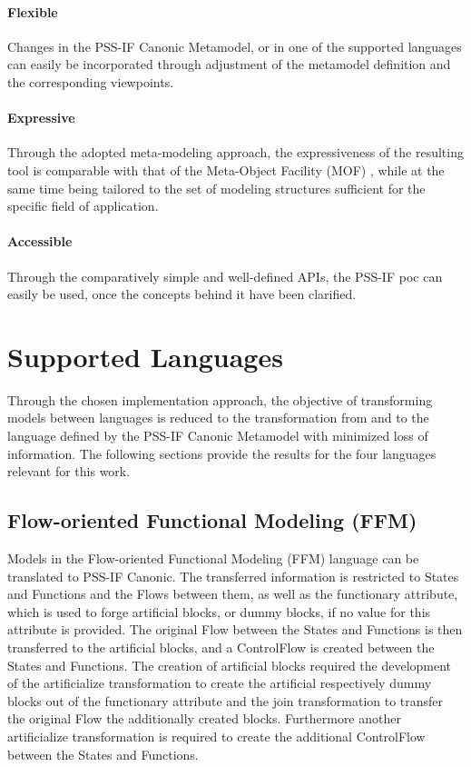 \paragraph{Flexible} Changes in the PSS-IF Canonic Metamodel, or in one of the supported languages can easily be incorporated through adjustment of the metamodel definition and the corresponding viewpoints.

\paragraph{Expressive} Through the adopted meta-modeling approach, the expressiveness of the resulting tool is comparable with that of the Meta-Object Facility (MOF) \cite{ref:mof}, while at the same time being tailored to the set of modeling structures sufficient for the specific field of application.

\paragraph{Accessible} Through the comparatively simple and well-defined APIs, the PSS-IF \gls{poc} can easily be used, once the concepts behind it have been clarified.

\section{Supported Languages}
\label{sec:results:languages}

Through the chosen implementation approach, the objective of transforming models between languages is reduced to the transformation from and to the language defined by the PSS-IF Canonic Metamodel with minimized loss of information. The following sections provide the results for the four languages relevant for this work.

\subsection{Flow-oriented Functional Modeling (FFM)}

Models in the Flow-oriented Functional Modeling (FFM) language can be translated to PSS-IF Canonic. The transferred information is restricted to States and Functions and the Flows between them, as well as the functionary attribute, which is used to forge artificial blocks, or dummy blocks, if no value for this attribute is provided. The original Flow between the States and Functions is then transferred to the artificial blocks, and a ControlFlow is created between the States and Functions. The creation of artificial blocks required the development of the artificialize transformation to create the artificial respectively dummy blocks out of the functionary attribute and the join transformation to transfer the original Flow the additionally created blocks. Furthermore another artificialize transformation is required to create the additional ControlFlow between the States and Functions.

